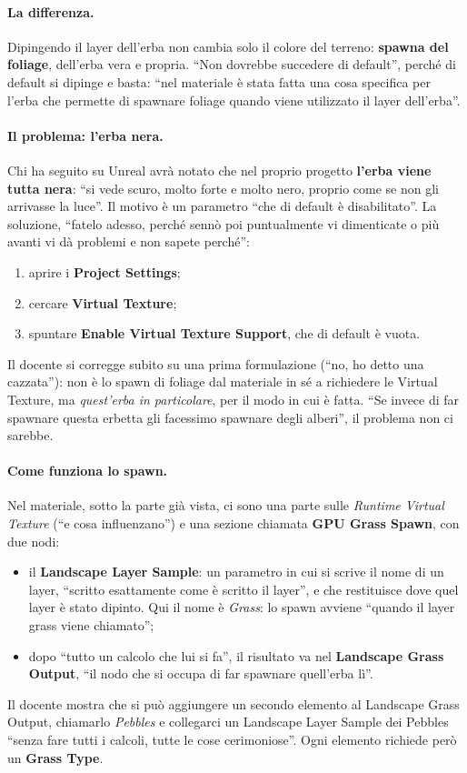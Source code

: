 \paragraph{La differenza.} Dipingendo il layer dell'erba non cambia solo il colore del
terreno: \textbf{spawna del foliage}, dell'erba vera e propria. ``Non dovrebbe succedere di
default'', perché di default si dipinge e basta: ``nel materiale è stata fatta una cosa
specifica per l'erba che permette di spawnare foliage quando viene utilizzato il layer
dell'erba''.

\paragraph{Il problema: l'erba nera.} Chi ha seguito su Unreal avrà notato che nel proprio
progetto \textbf{l'erba viene tutta nera}: ``si vede scuro, molto forte e molto nero, proprio
come se non gli arrivasse la luce''. Il motivo è un parametro ``che di default è
disabilitato''. La soluzione, ``fatelo adesso, perché sennò poi puntualmente vi dimenticate
o più avanti vi dà problemi e non sapete perché'':
\begin{enumerate}
  \item aprire i \textbf{Project Settings};
  \item cercare \textbf{Virtual Texture};
  \item spuntare \textbf{Enable Virtual Texture Support}, che di default è vuota.
\end{enumerate}
Il docente si corregge subito su una prima formulazione (``no, ho detto una cazzata''): non è
lo spawn di foliage dal materiale in sé a richiedere le Virtual Texture, ma
\emph{quest'erba in particolare}, per il modo in cui è fatta. ``Se invece di far spawnare
questa erbetta gli facessimo spawnare degli alberi'', il problema non ci sarebbe.

\paragraph{Come funziona lo spawn.} Nel materiale, sotto la parte già vista, ci sono una
parte sulle \emph{Runtime Virtual Texture} (``e cosa influenzano'') e una sezione chiamata
\textbf{GPU Grass Spawn}, con due nodi:
\begin{itemize}
  \item il \textbf{Landscape Layer Sample}: un parametro in cui si scrive il nome di un layer,
        ``scritto esattamente come è scritto il layer'', e che restituisce dove quel layer è
        stato dipinto. Qui il nome è \emph{Grass}: lo spawn avviene ``quando il layer grass
        viene chiamato'';
  \item dopo ``tutto un calcolo che lui si fa'', il risultato va nel \textbf{Landscape Grass
        Output}, ``il nodo che si occupa di far spawnare quell'erba lì''.
\end{itemize}
Il docente mostra che si può aggiungere un secondo elemento al Landscape Grass Output,
chiamarlo \emph{Pebbles} e collegarci un Landscape Layer Sample dei Pebbles ``senza fare
tutti i calcoli, tutte le cose cerimoniose''. Ogni elemento richiede però un \textbf{Grass
Type}.

